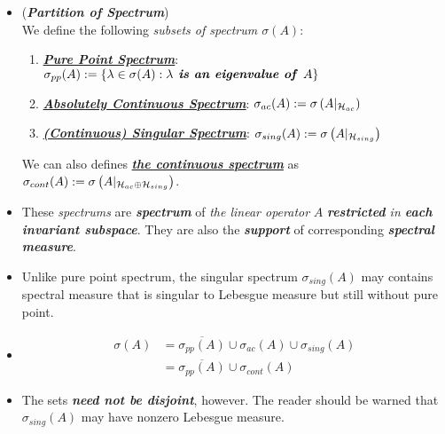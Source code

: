 \documentclass[11pt]{article}
\begin{document}
\begin{itemize}
\item \begin{definition}  (\textbf{\emph{Partition of Spectrum}})\\
We define the following \emph{subsets of spectrum $\sigma(A)$}:
\begin{enumerate}
\item \underline{\textbf{\emph{Pure Point Spectrum}}}: $\sigma_{pp}(A) := \left\{\lambda \in \sigma(A): \lambda \text{\emph{\textbf{ is an eigenvalue of }}}A\right\}$
\item \underline{\textbf{\emph{Absolutely Continuous Spectrum}}}: $\sigma_{ac}(A) := \sigma\left(A|_{{\mathcal H}_{ac}}\right)$
\item \underline{\textbf{\emph{(Continuous) Singular Spectrum}}}: $\sigma_{sing}(A) := \sigma\left(A|_{{\mathcal H}_{sing}}\right)$
\end{enumerate} We can also defines \underline{\textbf{\emph{the continuous spectrum}}} as $\sigma_{cont}(A) := \sigma\left(A|_{{\mathcal H}_{ac} \oplus {\mathcal H}_{sing}}\right)$.
\end{definition}

\item \begin{remark}
These \emph{spectrums} are \emph{\textbf{spectrum}} of \emph{the linear operator} $A$ \emph{\textbf{restricted} in \textbf{each invariant subspace}}. They are also  the \emph{\textbf{support}} of corresponding \emph{\textbf{spectral measure}}.
\end{remark}

\item \begin{remark}
Unlike pure point spectrum, the singular spectrum $\sigma_{sing}(A)$ may contains spectral measure that is singular to Lebesgue measure but still without pure point. 
\end{remark}

\item \begin{proposition} \citep{reed1980methods}
\begin{align*}
\sigma(A) &= \overline{\sigma_{pp}(A) } \cup \sigma_{ac}(A)  \cup \sigma_{sing}(A) \\
&= \overline{\sigma_{pp}(A) } \cup \sigma_{cont}(A) 
\end{align*}
\end{proposition}

\item \begin{remark}
The sets \emph{\textbf{need not be disjoint}}, however. The reader should be warned that $\sigma_{sing}(A)$ may have nonzero Lebesgue measure.
\end{remark}


\end{itemize}
\end{document}
